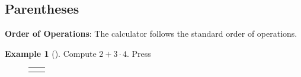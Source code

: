 \documentclass[10pt,]{book}
\newcommand{\terminology}[1]{\textbf{#1}}
\theoremstyle{plain}
\theoremstyle{definition}
\theoremstyle{definition}
\newtheorem{example}[theorem]{Example}
\theoremstyle{definition}
\numberwithin{equation}{part}
\newlength{\panelmax}
\begin{document}
\subsection[{Parentheses}]{Parentheses}\label{subsection-67}
\terminology{Order of Operations}: The calculator follows the standard order of operations.%
\begin{example}[]\label{example-96}
Compute \(2+3\cdot4\). Press%
{%
\setlength{\panelmax}{0pt}
\newsavebox{\panelboxAHUp}
\newlength{\phAHUp}\setlength{\phAHUp}{\ht\panelboxAHUp+\dp\panelboxAHUp}
\settototalheight{\phAHUp}{\usebox{\panelboxAHUp}}
\setlength{\panelmax}{\maxof{\panelmax}{\phAHUp}}
\newsavebox{\panelboxAHVp}
\newlength{\phAHVp}\setlength{\phAHVp}{\ht\panelboxAHVp+\dp\panelboxAHVp}
\settototalheight{\phAHVp}{\usebox{\panelboxAHVp}}
\setlength{\panelmax}{\maxof{\panelmax}{\phAHVp}}
\leavevmode%
\setlength{\tabcolsep}{0.025\textwidth}
\begin{figure}
\begin{tabular}{@{}*{2}{c}@{}}
\begin{minipage}[c][\panelmax][t]{0.6\textwidth}\usebox{\panelboxAHUp}\end{minipage}&
\begin{minipage}[c][\panelmax][t]{0.35\textwidth}\usebox{\panelboxAHVp}\end{minipage}\end{tabular}
\end{figure}
}%
\end{example}
\end{document}
